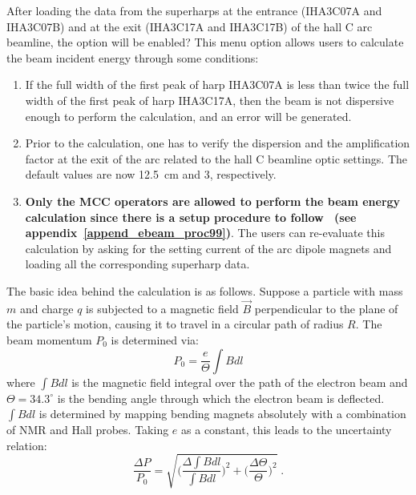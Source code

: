 After loading the data from the superharps at the entrance (IHA3C07A and IHA3C07B) and at
the exit (IHA3C17A and IHA3C17B) of the hall C arc beamline, 
the  option
will be enabled?  This menu option allows users to calculate the beam incident energy through some
conditions:
\begin{enumerate}
\item If the full width of the first peak of harp IHA3C07A is less than twice the full
width of the first peak of harp IHA3C17A, then the beam is not dispersive enough to perform the
calculation, and an error will be generated.
\item Prior to the calculation, one has to verify the dispersion and the amplification factor at the
exit of the arc related to the hall C beamline optic settings. The default values are now 12.5~cm and 3,
respectively.
\item {\bf Only the MCC operators are allowed to perform the beam energy calculation since there is a setup
procedure to follow~\cite{ebeam_proc99} (see
appendix~\ref{append_ebeam_proc99})}.  The users can
re-evaluate this calculation by asking for the setting current of the arc dipole magnets and loading all
the corresponding superharp data.
\end{enumerate}

The basic idea behind the calculation is as follows.
Suppose a particle with mass $m$ and charge $q$ is subjected to a magnetic field $\vec{B}$ perpendicular
to the plane of the particle's motion, causing it to travel in a circular path of radius $R$. The beam
momentum $P_0$ is determined via:
\begin{equation}
P_0 = \frac{e}{\Theta}\int Bdl
\end{equation}
where $\int Bdl$ is the magnetic field integral over the path of the electron beam and
$\Theta = 34.3^\circ$ is the bending angle through which the electron beam is deflected. $\int Bdl$ is
determined by mapping bending magnets absolutely with a combination of NMR and Hall probes. Taking $e$
as a constant, this leads to the uncertainty relation:
\begin{equation}
\frac{\Delta P}{P_0} = \sqrt{\Big (\frac{\Delta \int Bdl}{\int Bdl}\Big )^{2}
                     + \Big (\frac{\Delta \Theta}{\Theta}\Big )^{2}} \; .
\end{equation}

